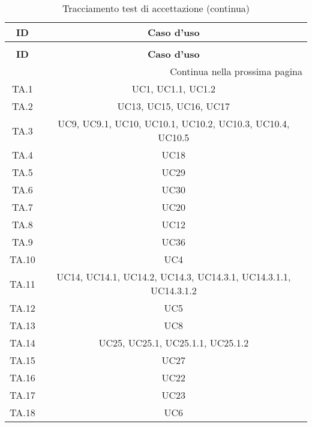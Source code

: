 \bgroup
\begin{adjustwidth}{-0.5cm}{-0.5cm}
	\centering
  \begin{longtable}{|c|c|}
		\caption{Tracciamento test di accettazione}
  	\label{tab:tracciamento-test-accettazione} \\
    \hline
		\textbf{ID} & \textbf{Caso d'uso} \\ 
		\hline
		\endfirsthead

		\caption[]{Tracciamento test di accettazione (continua)} \\
		\hline
		\textbf{ID} & \textbf{Caso d'uso} \\ 
		\hline
		\endhead

		\hline
		\multicolumn{2}{|r|}{{Continua nella prossima pagina}} \\ 
		\hline
		\endfoot

		\hline
		\endlastfoot

    TA.1 & UC1, UC1.1, UC1.2\\
		\hline TA.2 & UC13, UC15, UC16, UC17\\
		\hline TA.3 & UC9, UC9.1, UC10, UC10.1, UC10.2, UC10.3, UC10.4, UC10.5\\
		\hline TA.4 & UC18\\
		\hline TA.5 & UC29\\
		\hline TA.6 & UC30\\
		\hline TA.7 & UC20\\
		\hline TA.8 & UC12\\
		\hline TA.9 & UC36\\
		\hline TA.10 & UC4\\
		\hline TA.11 & UC14, UC14.1, UC14.2, UC14.3, UC14.3.1, UC14.3.1.1, UC14.3.1.2\\
		\hline TA.12 & UC5\\
		\hline TA.13 & UC8\\
		\hline TA.14 & UC25, UC25.1, UC25.1.1, UC25.1.2\\
		\hline TA.15 & UC27\\
		\hline TA.16 & UC22\\
		\hline TA.17 & UC23\\
		\hline TA.18 & UC6\\
  \end{longtable}
\end{adjustwidth}
\egroup